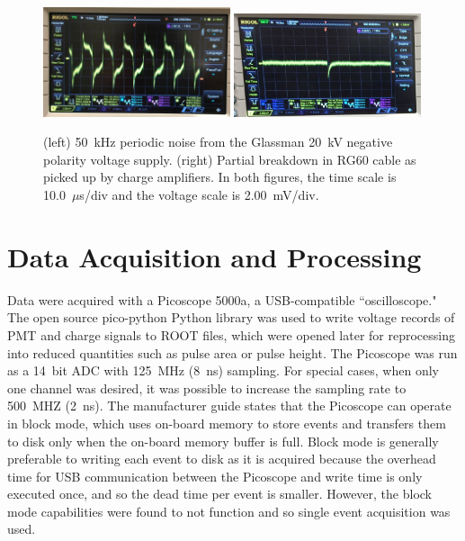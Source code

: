  \begin{figure}[htbp]
\begin{center}
\includegraphics[width = 0.49\textwidth, keepaspectratio]{figures/testbed/glassman_noise.png}
\includegraphics[width = 0.49\textwidth, keepaspectratio]{figures/testbed/partial_breakdown_pickup.png}
\caption{(left) 50~kHz periodic noise from the Glassman 20~kV negative polarity voltage supply. (right) Partial breakdown in RG60 cable as picked up by charge amplifiers. In both figures, the time scale is 10.0~$\mu$s/div and the voltage scale is 2.00~mV/div.}
\label{fig:pickup_noise}
\end{center}
\end{figure}






\section{Data Acquisition and Processing}
Data were acquired with a Picoscope 5000a, a USB-compatible ``oscilloscope." The open source pico-python Python library was used to write voltage records of \ac{PMT} and charge signals to ROOT files, which were opened later for reprocessing into reduced quantities such as pulse area or pulse height. The Picoscope was run as a 14~bit ADC with 125~MHz (8~ns) sampling. For special cases, when only one channel was desired, it was possible to increase the sampling rate to 500~MHZ (2~ns). The manufacturer guide states that the Picoscope can operate in block mode, which uses on-board memory to store events and transfers them to disk only when the on-board memory buffer is full. Block mode is generally preferable to writing each event to disk as it is acquired because the overhead time for USB communication between the Picoscope and write time is only executed once, and so the dead time per event is smaller. However, the block mode capabilities were found to not function and so single event acquisition was used.

